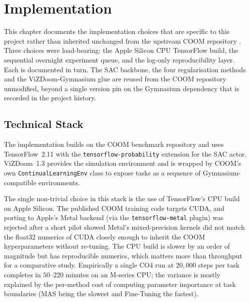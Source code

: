 \chapter{Implementation}
\label{ch:impl}

This chapter documents the implementation choices that are
specific to this project rather than inherited unchanged from
the upstream COOM repository \citep{tomilin2024coom}. Three
choices were load-bearing: the Apple Silicon CPU TensorFlow
build, the sequential overnight experiment queue, and the
log-only reproducibility layer. Each is documented in turn. The
SAC backbone, the four regularisation methods and the
ViZDoom-Gymnasium glue are reused from the COOM repository
unmodified, beyond a single version pin on the Gymnasium
dependency that is recorded in the project history.

\section{Technical Stack}
\label{sec:stack}

The implementation builds on the COOM benchmark repository
\citep{tomilin2024coom} and uses TensorFlow~2.11
\citep{abadi2016tensorflow} with the
\texttt{tensorflow-probability} extension for the SAC actor.
ViZDoom~1.3 \citep{kempka2016vizdoom} provides the simulation
environment and is wrapped by COOM's own
\texttt{ContinualLearningEnv} class to expose tasks as a sequence
of Gymnasium-compatible environments.

The single non-trivial choice in this stack is the use of
TensorFlow's CPU build on Apple Silicon. The published COOM
training code targets CUDA, and porting to Apple's Metal backend
(via the \texttt{tensorflow-metal} plugin) was rejected after a
short pilot showed Metal's mixed-precision kernels did not match
the float32 numerics of CUDA closely enough to inherit the COOM
hyperparameters without re-tuning. The CPU build is slower by an
order of magnitude but has reproducible numerics, which matters
more than throughput for a comparative study. Empirically a
single CO4 run at $20{,}000$ steps per task completes in
$50$--$220$ minutes on an M-series CPU; the variance is mostly
explained by the per-method cost of computing parameter
importance at task boundaries (MAS being the slowest and
Fine-Tuning the fastest).

